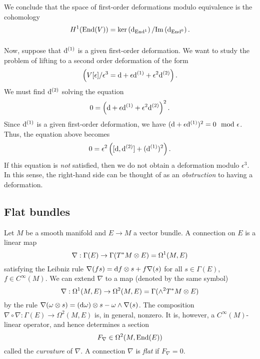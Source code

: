 \documentclass[11pt]{amsart}
\begin{document}
We conclude that the space of first-order deformations modulo equivalence is the cohomology
\[
H^1({\rm End}(V)) = \ker \left({\rm d}_{{\rm End}^1}\right) / {\rm Im} \left({\rm d}_{{\rm End}^0} \right) .
\] 


\subsubsection{}

Now, suppose that ${\rm d}^{(1)}$ is a given first-order deformation. 
We want to study the problem of lifting to a second order deformation of the form
\[
\left(V [\epsilon] / \epsilon^3 = {\rm d} + \epsilon {\rm d}^{(1)} + \epsilon^2 {\rm d}^{(2)}\right) .
\]
We must find ${\rm d}^{(2)}$ solving the equation
\[
0 = \left({\rm d} + \epsilon {\rm d}^{(1)} + \epsilon^2 {\rm d}^{(2)}\right)^2 .
\] 
Since ${\rm d}^{(1)}$ is a given first-order deformation, we have $({\rm d} + \epsilon {\rm d}^{(1)})^2 = 0 \mod \epsilon$. 
Thus, the equation above becomes
\[
0 = \epsilon^2 \left([{\rm d}, {\rm d}^{(2)}] + ({\rm d}^{(1)})^2\right) . 
\]
If this equation is {\em not} satisfied, then we do not obtain a deformation modulo $\epsilon^3$. 
In this sense, the right-hand side can be thought of as an {\em obstruction} to having a deformation. 

%

\subsection{Flat bundles}

Let $M$ be a smooth manifold and $E \to M$ a vector bundle. 
A connection on $E$ is a linear map
\[
\nabla : \Gamma(E) \to \Gamma(T^*M \otimes E) = \Omega^1(M, E)
\] 
satisfying the Leibniz rule $\nabla (f s) = {\rm d} f \otimes s + f \nabla(s)$ for all $s \in \Gamma(E)$, $f \in C^\infty(M)$. 
We can extend $\nabla$ to a map (denoted by the same symbol)
\[
\nabla : \Omega^1(M, E) \to \Omega^2(M,E) = \Gamma(\wedge^2 T^* M \otimes E)
\]
by the rule $\nabla(\omega \otimes s) = ({\rm d} \omega) \otimes s - \omega \wedge \nabla(s)$. 
The composition $\nabla \circ \nabla : \Gamma(E) \to \Omega^2(M , E)$ is, in general, nonzero. 
It is, however, a $C^\infty(M)$-linear operator, and hence determines a section
\[
F_\nabla \in \Omega^2(M, {\rm End}(E))
\]
called the {\em curvature} of $\nabla$. 
A connection $\nabla$ is {\em flat} if $F_\nabla = 0$. 
\end{document}
